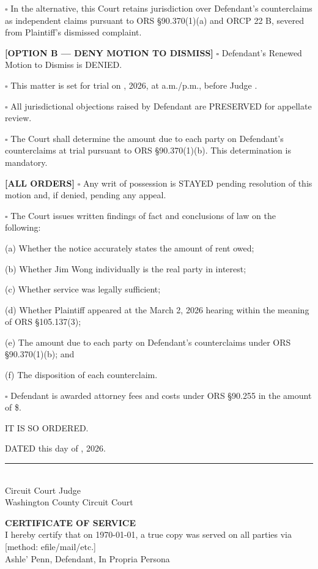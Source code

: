 \documentclass[12pt,letterpaper]{article}
\newcommand{\certificateofservice}[1]{%
\vspace{0.5in}
\noindent \textbf{CERTIFICATE OF SERVICE} \\
I hereby certify that on \today, a true copy was served on all parties via [method: efile/mail/etc.] \\
\vspace{0.5in}
#1 \\
}
\begin{document}
$\square$ In the alternative, this Court retains jurisdiction over Defendant's counterclaims as independent claims pursuant to ORS \S90.370(1)(a) and ORCP 22 B, severed from Plaintiff's dismissed complaint.

\textbf{[OPTION B --- DENY MOTION TO DISMISS]} $\square$ Defendant's Renewed Motion to Dismiss is DENIED.

$\square$ This matter is set for trial on \underline{\hspace{2in}}, 2026, at \underline{\hspace{0.75in}} a.m./p.m., before Judge \underline{\hspace{2in}}.

$\square$ All jurisdictional objections raised by Defendant are PRESERVED for appellate review.

$\square$ The Court shall determine the amount due to each party on Defendant's counterclaims at trial pursuant to ORS \S90.370(1)(b). This determination is mandatory.

\textbf{[ALL ORDERS]} $\square$ Any writ of possession is STAYED pending resolution of this motion and, if denied, pending any appeal.

$\square$ The Court issues written findings of fact and conclusions of law on the following:

(a) Whether the notice accurately states the amount of rent owed;

(b) Whether Jim Wong individually is the real party in interest;

(c) Whether service was legally sufficient;

(d) Whether Plaintiff appeared at the March 2, 2026 hearing within the meaning of ORS \S105.137(3);

(e) The amount due to each party on Defendant's counterclaims under ORS \S90.370(1)(b); and

(f) The disposition of each counterclaim.

$\square$ Defendant is awarded attorney fees and costs under ORS \S90.255 in the amount of \$\underline{\hspace{1.5in}}.

IT IS SO ORDERED.

DATED this \underline{\hspace{1.5in}} day of \underline{\hspace{2in}}, 2026.

\vspace{0.75in}

\noindent\rule{3in}{0.5pt} \\
Circuit Court Judge \\
Washington County Circuit Court

\certificateofservice{Ashle' Penn, Defendant, In Propria Persona}
\end{document}
